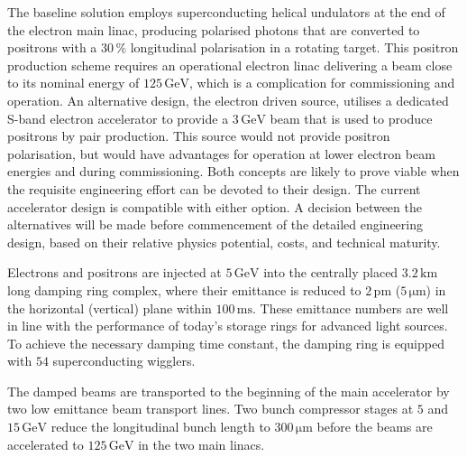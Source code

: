 \documentclass[%
 reprint,
 amsmath,amssymb,
 aps,
]{revtex4-1}
\begin{document}
The baseline solution employs superconducting helical undulators at the end of the electron main linac, producing polarised photons that are converted to positrons with a $30\,\%$ longitudinal polarisation in a rotating target.
This positron production scheme requires an operational electron linac delivering a beam close to its nominal energy of $125\,{\mathrm{GeV}}$, which is a complication for commissioning and operation. 
An alternative design, the electron driven source, utilises a dedicated S-band electron accelerator to provide a $3\,{\mathrm{GeV}}$ beam that is used to produce positrons by pair production.
This source would not provide positron polarisation,
but would have advantages for operation at lower electron beam energies and during commissioning.
Both concepts are
likely to prove viable when the requisite engineering effort can be devoted to their design.
The current accelerator design is compatible with either option. 
A decision between the alternatives will be made before commencement of the detailed engineering design, based on their relative physics potential, costs, and technical maturity.

Electrons and positrons are injected at $5\,{\mathrm{GeV}}$ into the centrally placed $3.2\,{\mathrm{km}}$ long damping ring complex, where their emittance is reduced to $2\,{\mathrm{pm}}$ ($5\,{\mathrm{\mu m}}$) in the horizontal (vertical) plane within $100\,{\mathrm{ms}}$. 
These emittance numbers are well in line with the performance of today's storage rings for advanced light sources.
To achieve the necessary damping time constant, the damping ring is equipped with $54$ superconducting wigglers. 

The damped beams are transported to the beginning of the main accelerator by two low emittance beam transport lines. Two bunch compressor stages at $5$ and $15\,{\mathrm{GeV}}$ reduce the longitudinal bunch length to $300\,{\mathrm{\mu m}}$ before the beams are accelerated to $125\,{\mathrm{GeV}}$ in the two main linacs.
\end{document}
